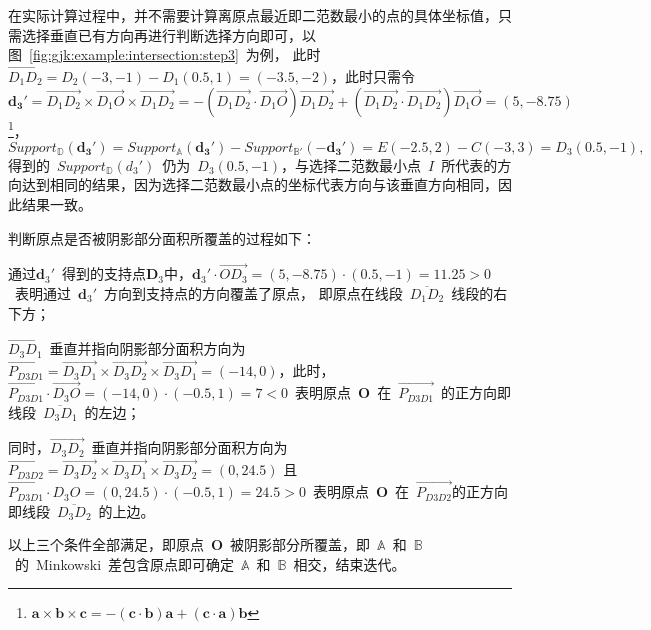 在实际计算过程中，并不需要计算离原点最近即二范数最小的点的具体坐标值，只需选择垂直已有方向再进行判断选择方向即可，以图~\ref{fig:gjk:example:intersection:step3}~为例，
此时~$\overrightarrow{D_1D_2} = D_2(-3, -1) - D_1(0.5, 1) = (-3.5, -2)$，此时只需令~
$\bm{d_3'} = \overrightarrow{D_1D_2} \times \overrightarrow{D_1O} \times \overrightarrow{D_1D_2} = -(\overrightarrow{D_1D_2} \cdot \overrightarrow{D_1O})\overrightarrow{D_1D_2} +
(\overrightarrow{D_1D_2} \cdot \overrightarrow{D_1D_2})\overrightarrow{D_1O} = (5,-8.75)$
\footnote{$\bm{a} \times \bm{b} \times \bm{c} = -(\bm{c}\cdot\bm{b})\bm{a}+(\bm{c}\cdot\bm{a})\bm{b}$}，
$  Support_\mathbb{D}(\bm{d_3'})  = Support_\mathbb{A}(\bm{d_3'}) - Support_\mathbb{B'}(-\bm{d_3'})  = E(-2.5, 2) - C(-3, 3)  = D_3(0.5, -1),$
得到的~$Support_\mathbb{D}(d_3')$~仍为~$D_3(0.5,-1)$，与选择二范数最小点~$I$~所代表的方向达到相同的结果，因为选择二范数最小点的坐标代表方向与该垂直方向相同，因此结果一致。

判断原点是否被阴影部分面积所覆盖的过程如下：\\ \indent
\begin{inparaenum}[(1)]
  \item 通过$\bm{d}_3'$~得到的支持点$\bm{D}_3$中，$\bm{d}_3' \cdot \overrightarrow{OD_3} = (5, -8.75) \cdot (0.5, -1) = 11.25 > 0$~表明通过~$\bm{d}_3'$~方向到支持点的方向覆盖了原点，
    即原点在线段~$\overline{D_1D_2}$~线段的右下方；\\ \indent
  \item $\overrightarrow{D_3D_1}$~垂直并指向阴影部分面积方向为~$\overrightarrow{P_{D3D1}}=\overrightarrow{D_3D_1} \times \overrightarrow{D_3D_2} \times \overrightarrow{D_3D_1} = (-14, 0)$，此时，
    $\overrightarrow{P_{D3D1}} \cdot \overrightarrow{D_3O} = (-14, 0) \cdot (-0.5, 1) = 7 < 0$~表明原点~$\bm{O}$~在~$\overrightarrow{P_{D3D1}}$~的正方向即线段~$\overline{D_3D_1}$~的左边；\\ \indent
  \item 同时，$\overrightarrow{D_3D_2}$~垂直并指向阴影部分面积方向为~$\overrightarrow{P_{D3D2}}=\overrightarrow{D_3D_2}
\times \overrightarrow{D_3D_1} \times \overrightarrow{D_3D_2} = (0, 24.5)$
且~$\overrightarrow{P_{D3D1}} \cdot D_3O = (0, 24.5) \cdot (-0.5, 1) = 24.5 > 0$~表明原点~$\bm{O}$~在~$\overrightarrow{P_{D3D2}}$的正方向即线段~$\overline{D_3D_2}$~的上边。\\ \indent
\end{inparaenum}
以上三个条件全部满足，即原点~$\bm{O}$~被阴影部分所覆盖，即~$\mathbb{A}$~和~$\mathbb{B}$~的~Minkowski~差包含原点即可确定~$\mathbb{A}$~和~$\mathbb{B}$~相交，结束迭代。


